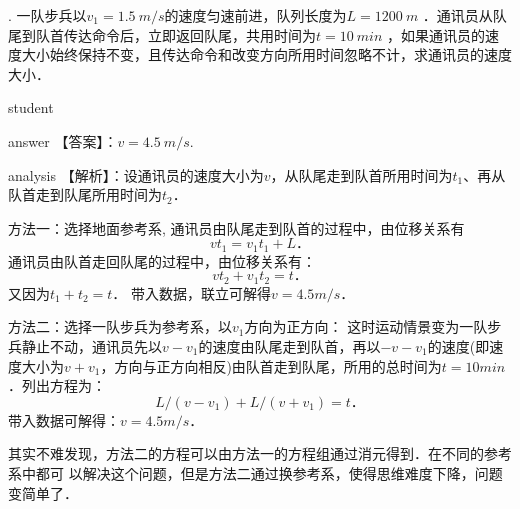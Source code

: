 \begin{example}
	. 一队步兵以$ v_1=1.5~\si{m/s}  $的速度匀速前进，队列长度为$ L=1200~\si{m} $ ．通讯员从队尾到队首传达命令后，立即返回队尾，共用时间为$ t=10~\si{min} $ ，如果通讯员的速度大小始终保持不变，且传达命令和改变方向所用时间忽略不计，求通讯员的速度大小．
	
	\begin{taggedblock}{student}
		\vspace*{3cm}
	\end{taggedblock}
	
	
	\begin{taggedblock}{answer}
		【答案】：$ v = 4.5~\si{m/s}. $
	\end{taggedblock}
	
	\begin{taggedblock}{analysis}
		【解析】：设通讯员的速度大小为$ v $，从队尾走到队首所用时间为$ t_1 $、再从队首走到队尾所用时间为$ t_2 $．
		
		方法一：选择地面参考系,
		通讯员由队尾走到队首的过程中，由位移关系有
		\[
		vt_1=v_1 t_1+L．
		\]
		通讯员由队首走回队尾的过程中，由位移关系有：
		\[
		vt_2+v_1 t_2=t．
		\]
		又因为$t_1+t_2=t$．		带入数据，联立可解得$v=4.5\si{m/s}$．
		
		方法二：选择一队步兵为参考系，以$ v_1 $方向为正方向：
		这时运动情景变为一队步兵静止不动，通讯员先以$ v-v_1 $的速度由队尾走到队首，再以$ -v-v_1 $的速度(即速度大小为$ v+v_1 $，方向与正方向相反)由队首走到队尾，所用的总时间为$ t=10\si{min} $．列出方程为：
		\[
		L/(v-v_1 )+L/(v+v_1 )=t．
		\]
		带入数据可解得：$v=4.5\si{m/s}$．
		
		其实不难发现，方法二的方程可以由方法一的方程组通过消元得到．在不同的参考系中都可
		以解决这个问题，但是方法二通过换参考系，使得思维难度下降，问题变简单了．
	
		
	\end{taggedblock}
\end{example}



